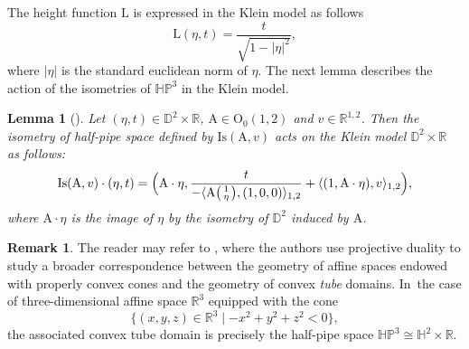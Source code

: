 \documentclass[10pt]{amsart}
\newenvironment{smallpmatrix}{\big(\begin{smallmatrix}}{\end{smallmatrix}\big)}
\theoremstyle{plain}
\newtheorem{lemma}[cor]{Lemma}
\theoremstyle{definition}
\newtheorem{remark}[cor]{Remark}
\newcommand{\HP}{\mathbb{HP}^3}
\begin{document}
The height function $\mathrm{L}$ is expressed in the Klein model as follows
\begin{equation}\label{formule_L_Klein}
\mathrm{L}(\eta,t)=\frac{t}{\sqrt{1-\lvert\eta\rvert^{2}}},
\end{equation} where $\lvert \eta\vert$ is the standard euclidean norm of $\eta$.
The next lemma describes the action of the isometries of $\HP$ in the Klein model.
\begin{lemma}[{\cite[Lem.\,2.26]{barbotfillastre}}]\label{rotationHP}
Let $(\eta, t)\in \mathbb{D}^2\times\mathbb{R}$, $\mathrm{A}\in \mathrm{O}_{0}(1,2)$ and $v\in \mathbb{R}^{1,2}$. Then the isometry of
half-pipe space defined by $\mathrm{Is}(\mathrm{A},v)$ acts on the Klein model $\mathbb{D}^2\times\mathbb{R}$ as follows:
\[
\mathrm{Is}(\mathrm{A},v)\cdot(\eta,t)=\Bigl(\mathrm{A}\cdot \eta, \frac{t}{-\langle \mathrm{A}\begin{smallpmatrix}
1 \\
\eta
\end{smallpmatrix} ,(1,0,0)\rangle_{1,2}}+\langle (1,\mathrm{A}\cdot \eta), v\rangle_{1,2} \Bigr),
\]
where $\mathrm{A}\cdot \eta$ is the image of $\eta$ by the isometry
of $\mathbb{D}^2$ induced by $\mathrm{A}$.
\end{lemma}

\begin{remark}
The reader may refer to \cite{ConvexAnal,affine}, where the authors use projective duality to study a broader correspondence between the geometry of affine spaces endowed with properly convex cones and the geometry of convex \emph{tube} domains. In~the case of three-dimensional affine space $\mathbb{R}^3$ equipped with the cone
\[
\{(x, y, z) \in \mathbb{R}^3 \mid -x^2 + y^2 + z^2 < 0\},
\]
the associated convex tube domain is precisely the half-pipe space $\HP \cong \mathbb{H}^2 \times \mathbb{R}$.
\end{remark}
\end{document}
